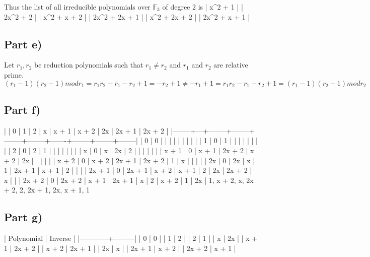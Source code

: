 \documentclass[10pt,a4paper]{article}
\begin{document}
Thus the list of all irreducible polynomials over $\mathbb{F}_{3}$
of degree $2$ is
| x^2 + 1       |
| 2x^2 + 2      |
| x^2 + x + 2   |
| 2x^2 + 2x + 1 |
| x^2 + 2x + 2  |
| 2x^2 + x + 1  |

\subsection*{Part e)}

Let $r_{1}, r_{2}$ be reduction polynomials such that $r_{1} \ne r_{2}$ and $r_{1}$ and $r_{2}$ are relative prime.
\begin{equation*}
  (r_{1} - 1)(r_{2} - 1) mod r_{1} = r_{1}r_{2} - r_{1} - r_{2} + 1 = -r_{2} + 1 \ne -r_{1} + 1 = r_{1}r_{2} - r_{1} - r_{2} + 1 = (r_{1} - 1)(r_{2} - 1) mod r_{2}
\end{equation*}

\subsection*{Part f)}

|        | 0 | 1      | 2      | x      |  x + 1 | x + 2 |     2x | 2x + 1 | 2x + 2 |
|--------+---+--------+--------+--------+--------+-------+--------+--------+--------|
| 0      | 0 |        |        |        |        |       |        |        |        |
| 1      | 0 | 1      |        |        |        |       |        |        |        |
| 2      | 0 | 2      | 1      |        |        |       |        |        |        |
| x      | 0 | x      | 2x     | 2      |        |       |        |        |        |
| x + 1  | 0 | x + 1  | 2x + 2 | x + 2  |     2x |       |        |        |        |
| x + 2  | 0 | x + 2  | 2x + 1 | 2x + 2 |      1 | x     |        |        |        |
| 2x     | 0 | 2x     | x      | 1      | 2x + 1 | x + 1 |      2 |        |        |
| 2x + 1 | 0 | 2x + 1 | x + 2  | x + 1  |      2 | 2x    | 2x + 2 | x      |        |
| 2x + 2 | 0 | 2x + 2 | x + 1  | 2x + 1 |      x | 2     |  x + 2 | 1      |     2x |
1, x + 2, x, 2x + 2, 2, 2x + 1, 2x, x + 1, 1
\subsection*{Part g)}

| Polynomial | Inverse |
|------------+---------|
| 0          | 0       |
| 1          | 2       |
| 2          | 1       |
| x          | 2x      |
| x + 1      | 2x + 2  |
| x + 2      | 2x + 1  |
| 2x         | x       |
| 2x + 1     | x + 2   |
| 2x + 2     | x + 1   |
\end{document}
